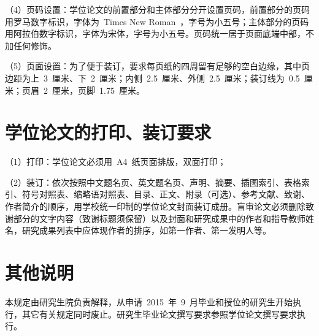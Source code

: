 （4）页码设置：学位论文的前置部分和主体部分分开设置页码，前置部分的页码用罗马数字标识，字体为~Times New Roman~，字号为小五号；主体部分的页码用阿拉伯数字标识，字体为宋体，字号为小五号。页码统一居于页面底端中部，不加任何修饰。

（5）页面设置：为了便于装订，要求每页纸的四周留有足够的空白边缘，其中页边距为上~3~厘米、下~2~厘米；内侧~2.5~厘米、外侧~2.5~厘米；装订线为~0.5~厘米；页眉~2~厘米，页脚~1.75~厘米。

\section{学位论文的打印、装订要求}

（1）打印：学位论文必须用~A4~纸页面排版，双面打印；

（2）装订：依次按照中文题名页、英文题名页、声明、摘要、插图索引、表格索引、符号对照表、缩略语对照表、目录、正文、附录（可选）、参考文献、致谢、作者简介的顺序，用学校统一印制的学位论文封面装订成册。盲审论文必须删除致谢部分的文字内容（致谢标题须保留）以及封面和研究成果中的作者和指导教师姓名，研究成果列表中应体现作者的排序，如第一作者、第一发明人等。

\section{其他说明}

本规定由研究生院负责解释，从申请~2015~年~9~月毕业和授位的研究生开始执行，其它有关规定同时废止。研究生毕业论文撰写要求参照学位论文撰写要求执行。
